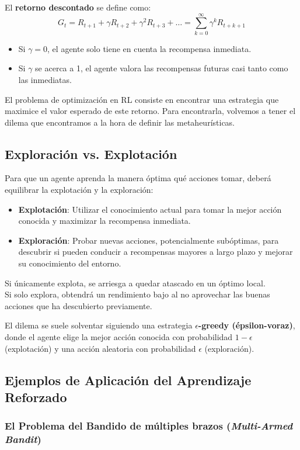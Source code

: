 \documentclass[12pt,a4paper]{book}
\begin{document}
El \textbf{retorno descontado} se define como:
\[ G_t = R_{t+1} + \gamma R_{t+2} + \gamma^2 R_{t+3} + \dots = \sum_{k=0}^{\infty} \gamma^k R_{t+k+1} \]

\begin{itemize}
    \item Si $\gamma = 0$, el agente solo tiene en cuenta la recompensa inmediata.
    \item Si $\gamma$ se acerca a 1, el agente valora las recompensas futuras casi tanto como las inmediatas.
\end{itemize}

El problema de optimización en RL consiste en encontrar una estrategia que maximice el valor esperado de este retorno. Para encontrarla, volvemos a tener el dilema que encontramos a la 
hora de definir las metaheurísticas.

\subsection{Exploración vs. Explotación}

Para que un agente aprenda la manera  óptima qué acciones tomar, deberá equilibrar la explotación y la exploración:
\begin{itemize}
    \item \textbf{Explotación}: Utilizar el conocimiento actual para tomar la mejor acción conocida y maximizar la recompensa inmediata.
    \item \textbf{Exploración}: Probar nuevas acciones, potencialmente subóptimas, para descubrir si pueden conducir a recompensas mayores a largo plazo y mejorar su conocimiento del entorno.
\end{itemize}
Si únicamente explota, se arriesga a quedar atascado en un óptimo local.\\
Si solo explora, obtendrá un rendimiento bajo al no aprovechar las buenas acciones que ha descubierto previamente.

El dilema se suele solventar siguiendo una estrategia \textbf{$\epsilon$-greedy (épsilon-voraz)}, donde el agente elige la mejor acción conocida con probabilidad $1-\epsilon$ (explotación) y una acción aleatoria con probabilidad $\epsilon$ (exploración).

\subsection{Ejemplos de Aplicación del Aprendizaje Reforzado}

\subsubsection{El Problema del Bandido de múltiples brazos (\textit{Multi-Armed Bandit})}
\end{document}
